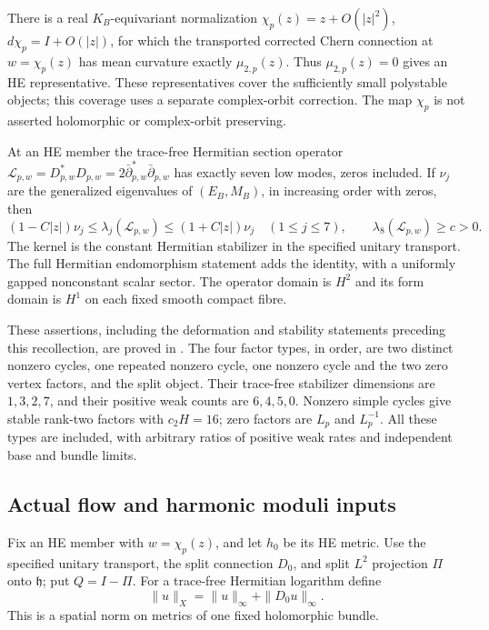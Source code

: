 \begin{recollection}\label{thm:bundle-input}
There is a real $K_B$-equivariant normalization
$\chi_p(z)=z+O(|z|^2)$, $d\chi_p=I+O(|z|)$, for which
the transported corrected Chern connection at $w=\chi_p(z)$
has mean curvature exactly $\mu_{2,p}(z)$.
Thus $\mu_{2,p}(z)=0$ gives an HE representative.
These representatives cover the sufficiently small polystable
objects; this coverage uses a separate complex-orbit correction.
The map $\chi_p$ is not asserted holomorphic or complex-orbit
preserving.

At an HE member the trace-free Hermitian section operator
$\mathcal L_{p,w}=D_{p,w}^*D_{p,w}
                 =2\bar\partial_{p,w}^*\bar\partial_{p,w}$
has exactly seven low modes, zeros included. If $\nu_j$
are the generalized eigenvalues of $(E_B,M_B)$, in increasing
order with zeros, then
\[
 (1-C|z|)\nu_j\le\lambda_j(\mathcal L_{p,w})
       \le(1+C|z|)\nu_j\quad(1\le j\le7),\qquad
 \lambda_8(\mathcal L_{p,w})\ge c>0.
\]
The kernel is the constant Hermitian stabilizer in the specified
unitary transport. The full Hermitian endomorphism statement adds
the identity, with a uniformly gapped nonconstant scalar sector.
The operator domain is $H^2$ and its form domain is $H^1$ on
each fixed smooth compact fibre.
\end{recollection}

These assertions, including the deformation and stability
statements preceding this recollection, are proved in
\cite[Sections~2--7]{W_HYM}. The four factor types, in order,
are two distinct nonzero cycles, one repeated nonzero cycle,
one nonzero cycle and the two zero vertex factors, and the
split object. Their trace-free stabilizer dimensions are
$1,3,2,7$, and their positive weak counts are $6,4,5,0$.
Nonzero simple cycles give stable rank-two factors with
$c_2H=16$; zero factors are $L_p$ and $L_p^{-1}$.
All these types are included, with arbitrary ratios of positive
weak rates and independent base and bundle limits.

\subsection{Actual flow and harmonic moduli inputs}

Fix an HE member with $w=\chi_p(z)$, and let $h_0$ be its
HE metric. Use the specified unitary transport, the split
connection $D_0$, and split $L^2$ projection $\Pi$ onto
$\mathfrak h$; put $Q=I-\Pi$. For a trace-free Hermitian
logarithm define
\[
 \|u\|_X=\|u\|_\infty+\|D_0u\|_\infty.
\]
This is a spatial norm on metrics of one fixed holomorphic bundle.

